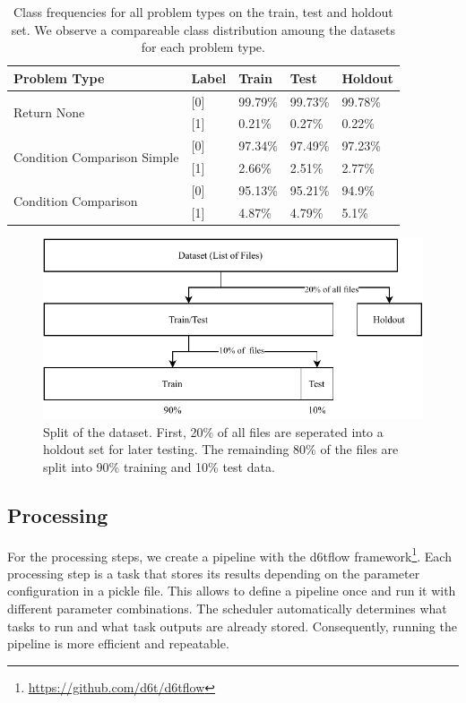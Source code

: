 \begin{table}[]
    \begin{tabularx}{\textwidth}{@{}lXXXX@{}}
    \toprule
    Problem Type                                 & Label& Train & Test & Holdout \\ \midrule 
    \multirow{2}{*}{Return None}                 & [0] & 99.79\%  & 99.73\% & 99.78\%  \\
                                                 & [1] & 0.21\%   & 0.27\%  & 0.22\%    \\ \midrule
    \multirow{2}{*}{Condition Comparison Simple} & [0] & 97.34\%   &  97.49\%  & 97.23\%  \\
                                                 & [1] & 2.66\%   & 2.51\% & 2.77\%    \\ \midrule
    \multirow{2}{*}{Condition Comparison}        & [0] & 95.13\%  & 95.21\%  & 94.9\%  \\
                                                 & [1] & 4.87\%   & 4.79\%  & 5.1\%    \\ \bottomrule
    \end{tabularx}
    \caption{Class frequencies for all problem types on the train, test and holdout set. We observe a compareable class distribution amoung the datasets for each problem type.}
    \label{tab:class_distribution}
\end{table}


\begin{figure}
    \includegraphics[width=1\textwidth]{img/ML/Data_split.pdf}
    \caption{Split of the dataset. First, 20\% of all files are seperated into a holdout set for later testing. The remainding 80\% of the files are split into 90\% training and 10\% test data. }
    \label{fig:data_split}
\end{figure}

\subsection{Processing}
For the processing steps, we create a pipeline with the d6tflow framework\footnote{\url{https://github.com/d6t/d6tflow}}. Each processing step is a task that stores its results depending on the parameter configuration in a pickle file. This allows to define a pipeline once and run it with different parameter combinations. The scheduler automatically determines what tasks to run and what task outputs are already stored. Consequently, running the pipeline is more efficient and repeatable.

